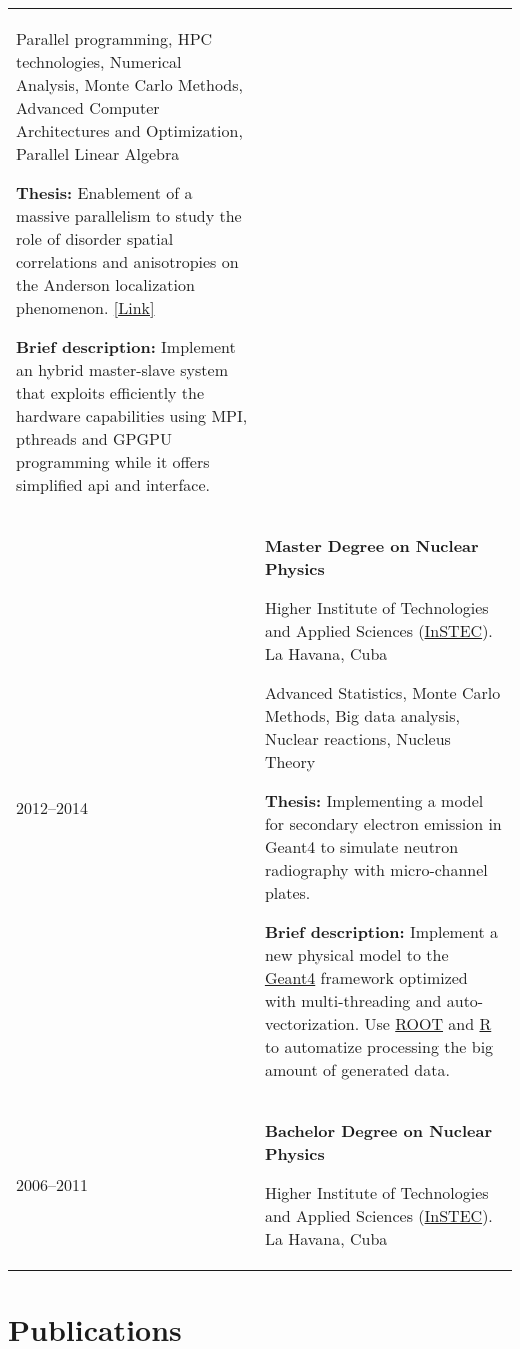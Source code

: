 \documentclass[a4paper,10pt]{article}
\begin{document}
\begin{tabularx}{\linewidth}{@{}l X@{}}
               Parallel programming, HPC technologies, Numerical Analysis, Monte
               Carlo Methods, Advanced Computer Architectures and Optimization,
               Parallel Linear Algebra

               \textbf{Thesis:} Enablement of a massive parallelism to study the role of disorder
               spatial correlations and anisotropies on the Anderson localization phenomenon.
               \href{https://backend.mhpc.sissa.it/sites/default/files/2021-02/JimmyAguilarMena.pdf}{[Link]}

               \textbf{Brief description:} Implement an hybrid master-slave system that exploits efficiently
               the hardware capabilities using MPI, pthreads and GPGPU programming while it offers
               simplified api and interface.
  \\

  2012--2014 & \textbf{Master Degree on Nuclear Physics}

               Higher Institute of Technologies and Applied Sciences (\href{www.instec.cu}{InSTEC}).
               La Havana, Cuba

               Advanced Statistics, Monte Carlo Methods, Big data analysis, Nuclear reactions, Nucleus Theory

               \textbf{Thesis:} Implementing a model for secondary electron emission in Geant4 to
               simulate neutron radiography with micro-channel plates.

               \textbf{Brief description:} Implement a new physical model to the
               \href{https://geant4.web.cern.ch/}{Geant4} framework optimized with multi-threading
               and auto-vectorization. Use \href{https://root.cern/}{ROOT} and
               \href{https://www.r-project.org/}{R} to automatize processing the big amount of
               generated data.
  \\

  2006--2011 & \textbf{Bachelor Degree on Nuclear Physics}

               Higher Institute of Technologies and Applied Sciences (\href{www.instec.cu}{InSTEC}).
               La Havana, Cuba
  \\
\end{tabularx}

\section{Publications}
\begin{refsection}
    \nocite{*}
    \printbibliography[heading=none]
\end{refsection}
\end{document}
